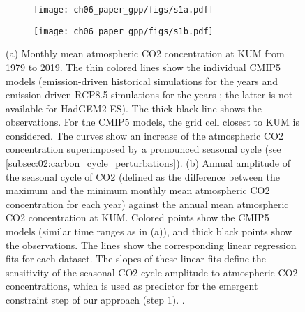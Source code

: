 \begin{figure}[p]
  \centering
  \begin{subfigure}[b]{0.39\columnwidth}
    \texttt{[image: ch06\_paper\_gpp/figs/s1a.pdf]}
    \caption{}
    \label{fig:app:b:co2:a}
  \end{subfigure}
  \begin{subfigure}[b]{0.39\columnwidth}
    \texttt{[image: ch06\_paper\_gpp/figs/s1b.pdf]}
    \caption{}
    \label{fig:app:b:co2:b}
  \end{subfigure}
  \begin{subfigure}[b]{0.2\columnwidth}
  \end{subfigure}
  \caption{(a) Monthly mean atmospheric \acs{CO2} concentration at \acf{KUM}
    from 1979 to 2019. The thin colored lines show the individual \acs{CMIP}5
    models (emission-driven historical simulations for the years
     and emission-driven \acs{RCP}8.5 simulations for the
    years ; the latter is not available for HadGEM2-ES). The
    thick black line shows the observations. For the \acs{CMIP}5 models, the
    grid cell closest to \acs{KUM} is considered. The curves show an increase
    of the atmospheric \acs{CO2} concentration superimposed by a pronounced
    seasonal cycle (see \cref{subsec:02:carbon_cycle_perturbations}). (b)
    Annual amplitude of the seasonal cycle of \acs{CO2} (defined as the
    difference between the maximum and the minimum monthly mean atmospheric
    \acs{CO2} concentration for each year) against the annual mean atmospheric
    \acs{CO2} concentration at \acs{KUM}. Colored points show the \acs{CMIP}5
    models (similar time ranges as in (a)), and thick black points show the
    observations. The lines show the corresponding linear regression fits for
    each dataset. The slopes of these linear fits define the sensitivity of
    the seasonal \acs{CO2} cycle amplitude to atmospheric \acs{CO2}
    concentrations, which is used as predictor for the emergent constraint
    step of our approach (step 1). .}
  \label{fig:app:b:co2}
\end{figure}

